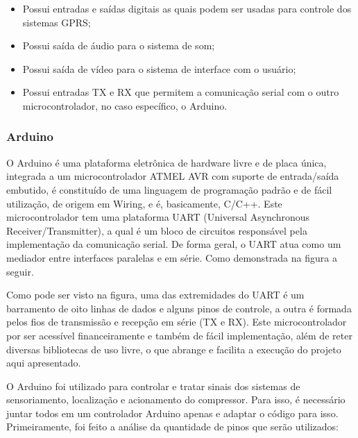 \begin{itemize}
  \item Possui entradas e saídas digitais as quais podem ser usadas para controle dos sistemas GPRS;
  \item Possui saída de áudio para o sistema de som;
  \item Possui saída de vídeo para o sistema de interface com o usuário;
  \item Possui entradas TX e RX que permitem a comunicação serial com o outro microcontrolador, no caso específico, o Arduino.
\end{itemize}

\subsubsection{Arduino}
O Arduino é uma plataforma eletrônica de hardware livre e de placa única, integrada a um microcontrolador ATMEL AVR com suporte de entrada/saída embutido, é constituído de uma linguagem de programação padrão e de fácil utilização, de origem em Wiring, e é, basicamente, C/C++. Este microcontrolador tem uma plataforma UART (Universal Asynchronous Receiver/Transmitter), a qual é um bloco de circuitos
responsável pela implementação da comunicação serial. De forma geral, o UART atua como um mediador entre interfaces paralelas e em série. Como demonstrada na figura a seguir.


Como pode ser visto na figura, uma das extremidades do UART é um barramento de oito linhas de dados e alguns pinos de controle, a outra é formada pelos fios de transmissão e recepção em série (TX e RX). Este microcontrolador por ser acessível financeiramente e também de fácil implementação, além de reter diversas bibliotecas de uso livre, o que abrange e facilita a execução do projeto aqui apresentado.

O Arduino foi utilizado para controlar e tratar sinais dos sistemas de sensoriamento, localização e acionamento do compressor. Para isso, é necessário juntar todos em um controlador Arduino apenas e adaptar o código para isso. Primeiramente, foi feito a análise da quantidade de pinos que serão utilizados:

